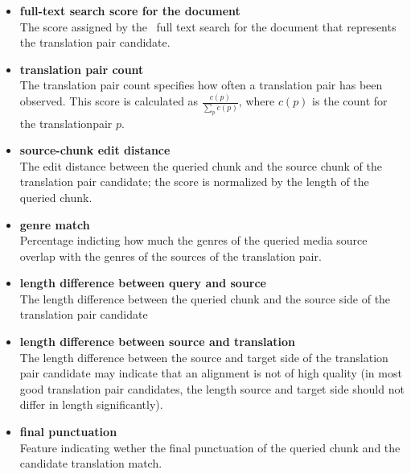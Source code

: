 \begin{itemize}
	
	\item \textbf{full-text search score for the document}\\
	The score assigned by the \postgres~full text search for the document that represents the translation pair candidate.
    
	\item \textbf{translation pair count}\\%
	The translation pair count specifies how often a translation pair has been observed. This score is calculated as $\frac{c(p)}{ \sum_p{c(p)}  } $, where $c(p)$ is the count for the translationpair $p$.
	
	\item \textbf{source-chunk edit distance}\\
	The edit distance between the queried chunk and the source chunk of the translation pair candidate; the score is normalized by the length of the queried chunk.
	
	\item \textbf{genre match}\\
	Percentage indicting how much the genres of the queried media source overlap with the genres of the sources of the translation pair.

	\item \textbf{length difference between query and source}\\
	The length difference between the queried chunk and the source side of the translation pair candidate 


	\item \textbf{length difference between source and translation}\\
	The length difference between the source and target side of the translation pair candidate may indicate that an alignment is not of high quality (in most good translation pair candidates,  the length source and target side should not differ in length significantly).
	
	\item \textbf{final punctuation}\\
	Feature indicating wether the final punctuation of the queried chunk and the candidate translation match.
	
	
	
\end{itemize}



\newpage
